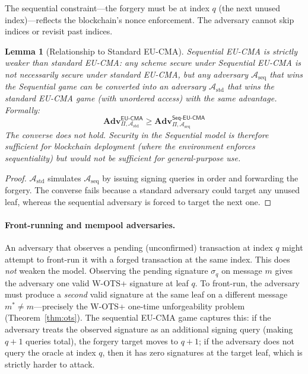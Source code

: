 \documentclass[11pt]{article}
\newtheorem{lemma}[theorem]{Lemma}
\newcommand{\adv}{\mathbf{Adv}}
\begin{document}
The sequential constraint---the forgery must be at index $q$ (the next
unused index)---reflects the blockchain's nonce enforcement. The
adversary cannot skip indices or revisit past indices.

\begin{lemma}[Relationship to Standard EU-CMA]\label{lem:model}
Sequential EU-CMA is strictly weaker than standard EU-CMA: any scheme
secure under Sequential EU-CMA is not necessarily secure under standard
EU-CMA, but any adversary $\mathcal{A}_{\mathrm{seq}}$ that wins the
Sequential game can be converted into an adversary
$\mathcal{A}_{\mathrm{std}}$ that wins the standard EU-CMA game
(with unordered access) with the same advantage. Formally:
\[
\adv^{\mathsf{EU\text{-}CMA}}_{\Pi,\mathcal{A}_{\mathrm{std}}} \geq
\adv^{\mathsf{Seq\text{-}EU\text{-}CMA}}_{\Pi,\mathcal{A}_{\mathrm{seq}}}
\]
The converse does not hold. Security in the Sequential model is
therefore \emph{sufficient} for blockchain deployment (where the
environment enforces sequentiality) but would not be sufficient for
general-purpose use.
\end{lemma}

\begin{proof}
$\mathcal{A}_{\mathrm{std}}$ simulates $\mathcal{A}_{\mathrm{seq}}$
by issuing signing queries in order and forwarding the forgery. The
converse fails because a standard adversary could target any unused
leaf, whereas the sequential adversary is forced to target the next one.
\end{proof}

\paragraph{Front-running and mempool adversaries.}
An adversary that observes a pending (unconfirmed) transaction at
index $q$ might attempt to front-run it with a forged transaction at
the same index. This does \emph{not} weaken the model.  Observing
the pending signature $\sigma_q$ on message $m$ gives the adversary
one valid W-OTS+ signature at leaf $q$.  To front-run, the adversary
must produce a \emph{second} valid signature at the same leaf on a
different message $m^* \neq m$---precisely the W-OTS+ one-time
unforgeability problem (Theorem~\ref{thm:ots}).  The sequential
EU-CMA game captures this: if the adversary treats the observed
signature as an additional signing query (making $q + 1$ queries
total), the forgery target moves to $q + 1$; if the adversary does
not query the oracle at index $q$, then it has zero signatures at
the target leaf, which is strictly harder to attack.
\end{document}
